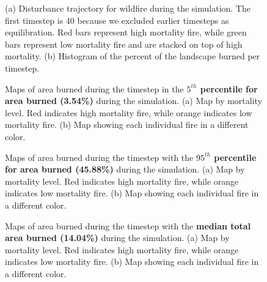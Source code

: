 
\begin{figure}[!htbp]
  \centering
  \caption{\small (a) Disturbance trajectory for wildfire during the simulation. The first timestep is 40 because we excluded earlier timesteps as equilibration. Red bars represent high mortality fire, while green bars represent low mortality fire and are stacked on top of high mortality. (b) Histogram of the percent of the landscape burned per timestep.} 
  \label{fig:darea}
\end{figure}
\clearpage

\begin{figure}[!htbp]
  \centering
  \caption{Maps of area burned during the timestep in the \textbf{$5^{th}$ percentile for area burned (3.54\%)} during the simulation. (a) Map by mortality level. Red indicates high mortality fire, while orange indicates low mortality fire. (b) Map showing each individual fire in a different color.}
  \label{fig:darea_min_map}
\end{figure}

\begin{figure}[!htbp]
  \centering
  \caption{Maps of area burned during the timestep with the \textbf{$95^{th}$ percentile for area burned (45.88\%)} during the simulation. (a) Map by mortality level. Red indicates high mortality fire, while orange indicates low mortality fire. (b) Map showing each individual fire in a different color.}
  \label{fig:darea_max_map}
\end{figure}

\begin{figure}[!htbp]
  \centering
  \caption{Maps of area burned during the timestep with the \textbf{median total area burned (14.04\%)} during the simulation. (a) Map by mortality level. Red indicates high mortality fire, while orange indicates low mortality fire. (b) Map showing each individual fire in a different color.}
  \label{fig:darea_median_map}
\end{figure}

